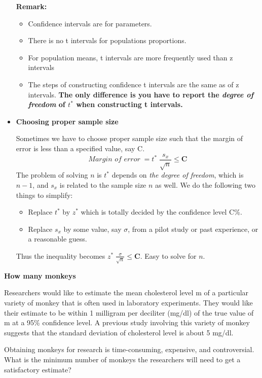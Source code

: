 \documentclass[a4paper, 12pt,twoside]{book}
\begin{document}
\begin{itemize}
 \vspace{0.6cm}
 
 \colorbox{babypink}{\parbox{\textwidth}{
 \textbf{Remark:}
 
 \begin{itemize}
     \item Confidence intervals are for parameters.
     \item There is no t intervals for populations proportions.
     \item For population means, t intervals are more frequently used than z intervals 
     \item The steps of constructing confidence t intervals are the same as of z intervals.  \textbf{The only difference is you have to report the \textit{degree of freedom} of $t^*$ when constructing t intervals.}   
 \end{itemize}
 }}
 
  \newpage
  
 \item \textbf{Choosing proper sample size}\vspace{0.3cm}
 
 Sometimes we have to choose proper sample size such that the margin of error is less than a specified value, say C.
 $$\textit{Margin of error}\; = t^*\;\frac{s_x}{\sqrt{n}}\leq \textbf{C}$$
 The problem of solving $n$ is $t^*$ depends on \textit{the degree of freedom}, which is $n-1$, and $s_x$ is related to the sample size $n$ as well. We do the following two things to simplify:
 \begin{itemize}
     \item Replace $t^*$ by $z^*$ which is totally decided by the confidence level C\%.
     \item Replace $s_x$ by some value, say $\sigma$, from a pilot study or past experience, or a reasonable guess.
 \end{itemize}
 Thus the inequality becomes \hspace{0.3cm}
     $\displaystyle{ z^*\;\frac{\sigma}{\sqrt{n}}\leq \textbf{C}}$. \hspace{0.3cm} Easy to solve for $n$.
   \end{itemize} \vspace{0.3cm}

 \colorbox{champagne}{\parbox{\textwidth}{
 \textbf{How many monkeys}\vspace{0.3cm}
 
 Researchers would like to estimate the mean cholesterol level m of a particular  variety of monkey that is often used in laboratory experiments. They would like their estimate to be within 1 milligram per deciliter (mg/dl) of the true value of m at a 95\% confidence level. A previous study involving this variety of monkey suggests that the standard deviation of cholesterol level is about 5 mg/dl.\vspace{0.3cm}
 
 Obtaining monkeys for research is time-consuming, expensive, and controversial. What is the minimum number of monkeys the researchers will need to get a satisfactory estimate?
 }}
 \newpage
 
\end{document}
